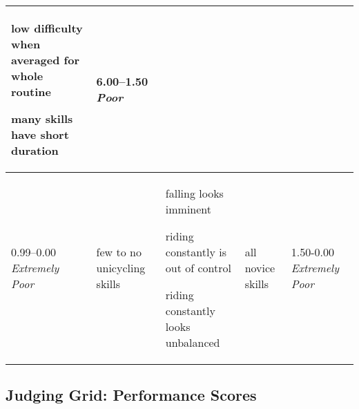 \begin{minipage}{\textwidth}
\begin{longtable}{|p{1.5cm}|p{5cm}|p{5cm}|p{5cm}|p{1.5cm}|}
\begin{judging_items}%
\item low difficulty when averaged for whole routine
\item many skills have short duration
\end{judging_items} &

6.00--1.50 \newline
\emph{Poor} \\
\hline

0.99--0.00 \newline
\emph{Extremely Poor} &

\begin{judging_items}%
\item few to no unicycling skills
\end{judging_items} &

\begin{judging_items}%
\item falling looks imminent
\item riding constantly is out of control
\item riding constantly looks unbalanced
\end{judging_items} &

\begin{judging_items}%
\item all novice skills
\end{judging_items} &

1.50-0.00 \newline
\emph{Extremely Poor} \\
\hline

\end{longtable}
\endgroup
\end{minipage}


\newpage
\subsection{Judging Grid: Performance Scores}

